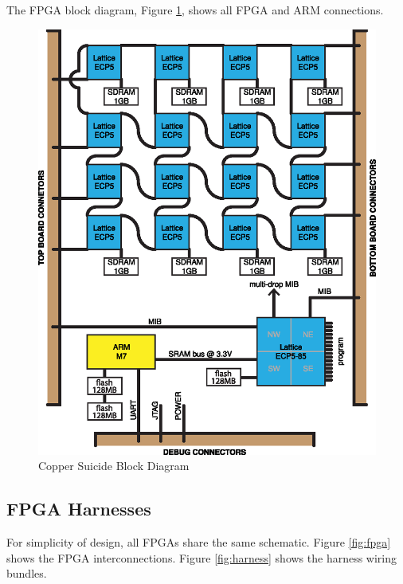 \documentclass{article}
\begin{document}
The FPGA block diagram, Figure \ref{fig:blockdiagram}, shows all FPGA and ARM connections.

\begin{figure}[H]
  \centering
  \includegraphics[scale=1]{cs_block_diagram.eps}
  \caption{Copper Suicide Block Diagram}
  \label{fig:blockdiagram}
\end{figure}

\subsection{FPGA Harnesses}

For simplicity of design, all FPGAs share the same schematic. Figure \ref{fig:fpga} shows the FPGA interconnections. Figure \ref{fig:harness} shows the harness wiring bundles.
\end{document}
